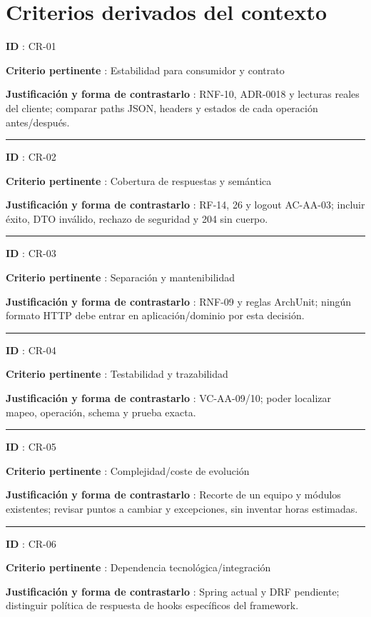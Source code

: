 \documentclass[12pt,a4paper]{report}
\begin{document}
\section{Criterios derivados del
contexto}\label{analisis-criterios-derivados-del-contexto}

\textbf{ID }: CR-01

\textbf{Criterio pertinente }: Estabilidad para consumidor y contrato

\textbf{Justificación y forma de contrastarlo }: RNF-10, ADR-0018 y
lecturas reales del cliente; comparar paths JSON, headers y estados de
cada operación antes/después.

\medskip\hrule\medskip

\textbf{ID }: CR-02

\textbf{Criterio pertinente }: Cobertura de respuestas y semántica

\textbf{Justificación y forma de contrastarlo }: RF-14, 26 y
logout AC-AA-03; incluir éxito, DTO inválido, rechazo de seguridad y 204
sin cuerpo.

\medskip\hrule\medskip

\textbf{ID }: CR-03

\textbf{Criterio pertinente }: Separación y mantenibilidad

\textbf{Justificación y forma de contrastarlo }: RNF-09 y reglas
ArchUnit; ningún formato HTTP debe entrar en aplicación/dominio por esta
decisión.

\medskip\hrule\medskip

\textbf{ID }: CR-04

\textbf{Criterio pertinente }: Testabilidad y trazabilidad

\textbf{Justificación y forma de contrastarlo }: VC-AA-09/10; poder
localizar mapeo, operación, schema y prueba exacta.

\medskip\hrule\medskip

\textbf{ID }: CR-05

\textbf{Criterio pertinente }: Complejidad/coste de evolución

\textbf{Justificación y forma de contrastarlo }: Recorte de un equipo y
módulos existentes; revisar puntos a cambiar y excepciones, sin inventar
horas estimadas.

\medskip\hrule\medskip

\textbf{ID }: CR-06

\textbf{Criterio pertinente }: Dependencia tecnológica/integración

\textbf{Justificación y forma de contrastarlo }: Spring actual y DRF
pendiente; distinguir política de respuesta de hooks específicos del
framework.
\end{document}
